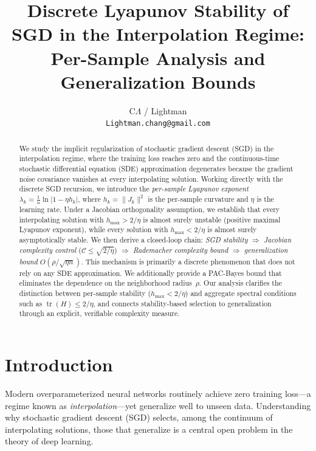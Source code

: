 \documentclass[11pt,a4paper]{article}
\title{\Large Discrete Lyapunov Stability of SGD in the Interpolation Regime:\\[4pt]
  \large Per-Sample Analysis and Generalization Bounds}
\author{
  C$\Lambda$ / Lightman\\
  \texttt{Lightman.chang@gmail.com}
}
\date{}
\theoremstyle{definition}
\theoremstyle{remark}
\DeclareMathOperator{\tr}{tr}
\newcommand{\cC}{\mathcal{C}}
\begin{document}
\maketitle

\begin{abstract}
We study the implicit regularization of stochastic gradient descent (SGD) in the
interpolation regime, where the training loss reaches zero and the continuous-time
stochastic differential equation (SDE) approximation degenerates because the gradient
noise covariance vanishes at every interpolating solution.  Working directly with the
discrete SGD recursion, we introduce the \emph{per-sample Lyapunov exponent}
$\lambda_k = \frac{1}{n}\ln|1 - \eta h_k|$, where $h_k = \|J_k\|^2$ is the
per-sample curvature and $\eta$ is the learning rate.  Under a Jacobian orthogonality
assumption, we establish that every interpolating solution with
$h_{\max} > 2/\eta$ is almost surely unstable (positive maximal Lyapunov exponent),
while every solution with $h_{\max} < 2/\eta$ is almost surely asymptotically
stable.  We then derive a closed-loop chain:
\emph{SGD stability} $\Rightarrow$ \emph{Jacobian complexity control}
($\cC \leq \sqrt{2/\eta}$) $\Rightarrow$ \emph{Rademacher complexity bound}
$\Rightarrow$ \emph{generalization bound} $O(\rho/\sqrt{\eta n})$.
This mechanism is primarily a discrete phenomenon that does not rely on any
SDE approximation.  We additionally provide a PAC-Bayes bound that eliminates the
dependence on the neighborhood radius~$\rho$.  Our analysis clarifies the distinction
between per-sample stability ($h_{\max} < 2/\eta$) and aggregate spectral conditions
such as $\tr(H) \leq 2/\eta$, and connects stability-based selection to
generalization through an explicit, verifiable complexity measure.
\end{abstract}

\section{Introduction}\label{sec:intro}

Modern overparameterized neural networks routinely achieve zero training loss---a
regime known as \emph{interpolation}---yet generalize well to unseen data.
Understanding why stochastic gradient descent (SGD) selects, among the continuum of
interpolating solutions, those that generalize is a central open problem in the
theory of deep learning.
\end{document}

